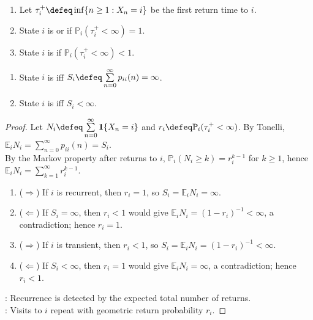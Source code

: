 \begin{definition} \label{def:recurrent-transient-state} 
\begin{enumerate}[label=(\roman*)]
\setlength{\itemsep}{0pt}
\item Let $\tau_i^+\defeq\inf\{n\geq1:X_n=i\}$ be the first return time to $i$.
\item State $i$ is  or  if $\mathbb{P}_i(\tau_i^+<\infty)=1$.
\item State $i$ is  if $\mathbb{P}_i(\tau_i^+<\infty)<1$.
\end{enumerate}
\end{definition}

\begin{theorem} \label{thm:recurrence-transition-sum-criterion} 
\begin{enumerate}[label=(\roman*)]
\setlength{\itemsep}{0pt}
\item State $i$ is  iff $S_i\defeq\sum\limits_{n=0}^{\infty}p_{ii}(n)=\infty$.
\item State $i$ is  iff $S_i<\infty$.
\end{enumerate}
\begin{proof} Let $N_i\defeq\sum\limits_{n=0}^{\infty}\mathbf{1}\{X_n=i\}$ and $r_i\defeq\mathbb{P}_i(\tau_i^+<\infty)$. By Tonelli, $\mathbb{E}_iN_i=\sum\limits_{n=0}^{\infty}p_{ii}(n)=S_i$.\\
By the Markov property after returns to $i$, $\mathbb{P}_i(N_i\geq k)=r_i^{k-1}$ for $k\geq1$, hence $\mathbb{E}_iN_i=\sum\limits_{k=1}^{\infty}r_i^{k-1}$.
\begin{enumerate}[label=(\roman*)]
\setlength{\itemsep}{0pt}
\item[$(i)$] ($\Rightarrow$) If $i$ is recurrent, then $r_i=1$, so $S_i=\mathbb{E}_iN_i=\infty$.
\item[$(i)$] ($\Leftarrow$) If $S_i=\infty$, then $r_i<1$ would give $\mathbb{E}_iN_i=(1-r_i)^{-1}<\infty$, a contradiction; hence $r_i=1$.
\item[$(ii)$] ($\Rightarrow$) If $i$ is transient, then $r_i<1$, so $S_i=\mathbb{E}_iN_i=(1-r_i)^{-1}<\infty$.
\item[$(ii)$] ($\Leftarrow$) If $S_i<\infty$, then $r_i=1$ would give $\mathbb{E}_iN_i=\infty$, a contradiction; hence $r_i<1$.
\end{enumerate}
: Recurrence is detected by the expected total number of returns.\\
: Visits to $i$ repeat with geometric return probability $r_i$.
\end{proof}
\end{theorem}

